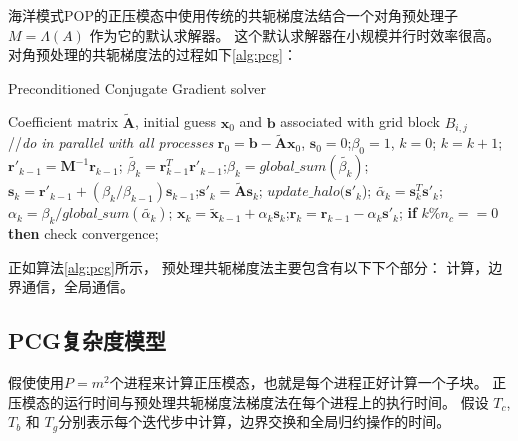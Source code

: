 海洋模式POP的正压模态中使用传统的共轭梯度法结合一个对角预处理子$M = \Lambda(A)$ 作为它的默认求解器。 
这个默认求解器在小规模并行时效率很高。 
对角预处理的共轭梯度法的过程如下\ref{alg:pcg}： 
\vspace{-10pt}
\begin{algorithm}[h]
\caption{Preconditioned Conjugate Gradient solver}
\label{alg:pcg}
\begin{algorithmic}[1]
\REQUIRE Coefficient matrix $\tilde{\textbf{A}}$, initial guess $\textbf{x}_0$ and $\textbf{b}$ associated with grid block $B_{i,j}$ \\
//\qquad    \textit{do in parallel with all processes}
\STATE $\textbf{r}_0 = \textbf{b}-\tilde{\textbf{A}}\textbf{x}_0$, $\textbf{s}_0 =0$;\quad $\beta_0=1$, $k=0$;
\STATE $k=k+1$;\quad $\textbf{r}'_{k-1} =\textbf{M}^{-1}\textbf{r}_{k-1}$;\quad {}
\STATE $\tilde{\beta_k} = \textbf{r}_{k-1}^T\textbf{r}'_{k-1}$;\quad $\beta_k = global\_sum(\tilde{\beta_k})$; 
\STATE $\textbf{s}_k = \textbf{r}'_{k-1} +(\beta_k/\beta_{k-1})\textbf{s}_{k-1}$;\quad $\textbf{s}'_k = \tilde{\textbf{A}}\textbf{s}_k$; 
\STATE $update\_halo(\textbf{s}'_k$); 
\STATE $\tilde{\alpha_k} = \textbf{s}_k^T\textbf{s}'_k$;\quad $\alpha_k =\beta_k/ global\_sum(\tilde{\alpha_k})$;\quad {}
\STATE $\textbf{x}_k =\tilde{\textbf{x}}_{k-1} +\alpha_k \textbf{s}_k$;\quad $\textbf{r}_k =\textbf{r}_{k-1} -\alpha_k\textbf{s}'_k$;
\STATE \textbf{if} $k \% n_{c} == 0$ \textbf{then} check convergence;
\ENDWHILE
\end{algorithmic}
\end{algorithm}
\vspace{-10pt}

 
正如算法\ref{alg:pcg}所示， 预处理共轭梯度法主要包含有以下下个部分： 计算，边界通信，全局通信。 
 
\subsection{PCG复杂度模型}
 假使使用$P=m^2$个进程来计算正压模态，也就是每个进程正好计算一个子块。 
正压模态的运行时间与预处理共轭梯度法梯度法在每个进程上的执行时间。 
假设 $T_c$, $T_b$ 和 $T_g$分别表示每个迭代步中计算，边界交换和全局归约操作的时间。 

